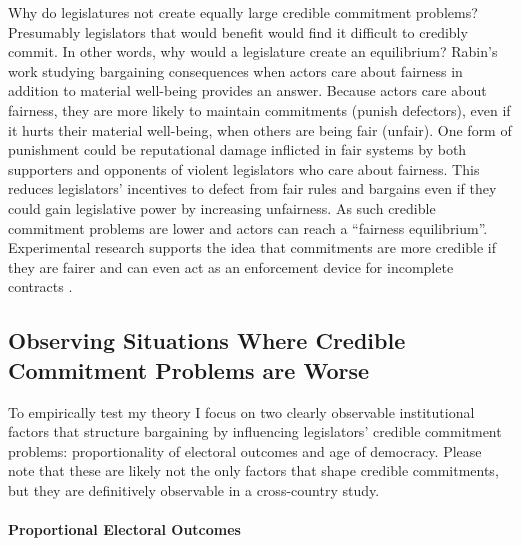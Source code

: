 \documentclass[a4paper]{article}\usepackage[]{graphicx}\usepackage[]{color}
\begin{document}
Why do  legislatures  not create equally large credible commitment problems? Presumably legislators that would benefit  would find it difficult to credibly commit. In other words, why would a  legislature  create an equilibrium? Rabin's \citeyearpar{Rabin1993} work studying bargaining consequences when actors care about fairness in addition to material well-being provides an answer. Because actors care about fairness, they are more likely to maintain commitments (punish defectors), even if it hurts their material well-being, when others are being fair (unfair). One form of punishment could be reputational damage inflicted in fair systems by both supporters and opponents of violent legislators who care about fairness. This reduces legislators' incentives to defect from fair rules and bargains even if they could gain legislative power by increasing unfairness. As such credible commitment problems are lower and actors can reach a ``fairness equilibrium''. Experimental research supports the idea that commitments are more credible if they are fairer \citep{Ellingsen2004} and can even act as an enforcement device for incomplete contracts \citep[for a review]{Fehr2008}.

\subsection{Observing Situations Where Credible Commitment Problems are Worse}

To empirically test my theory I focus on two clearly observable institutional factors that structure bargaining by influencing legislators' credible commitment problems: proportionality of electoral outcomes and age of democracy. Please note that these are likely not the only factors that shape credible commitments, but they are definitively observable in a cross-country study.

\paragraph{Proportional Electoral Outcomes}
\end{document}
